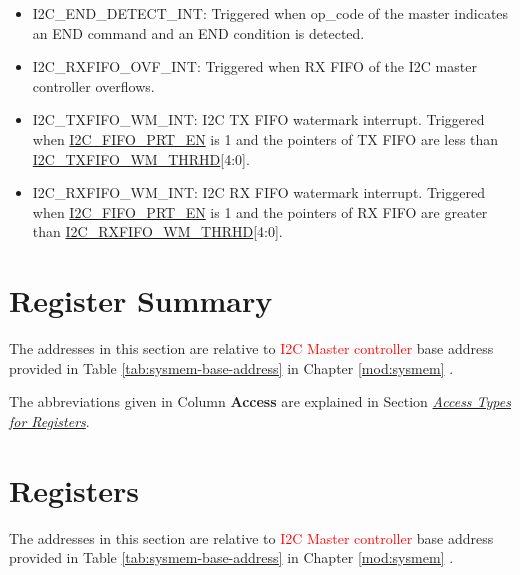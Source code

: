 \documentclass[main\_\_EN.tex]{subfiles}
\begin{document}
\begin{itemize}
\item \label{int:i2c-end}I2C\_END\_DETECT\_INT: Triggered when op\_code of the master indicates an END command and an END condition is detected.
\item \label{int:i2c-rxfifo-ovf}I2C\_RXFIFO\_OVF\_INT: Triggered when RX FIFO of the I2C master controller overflows.
\item \label{int:i2c-txfifo-wm}I2C\_TXFIFO\_WM\_INT: I2C TX FIFO watermark interrupt. Triggered when \hyperref[fielddesc:I2CFIFOPRTEN]{I2C\_FIFO\_PRT\_EN} is 1 and the pointers of TX FIFO are less than \hyperref[fielddesc:I2CTXFIFOWMTHRHD]{I2C\_TXFIFO\_WM\_THRHD}[4:0].
\item \label{int:i2c-rxfifo-wm}I2C\_RXFIFO\_WM\_INT: I2C RX FIFO watermark interrupt. Triggered when \hyperref[fielddesc:I2CFIFOPRTEN]{I2C\_FIFO\_PRT\_EN} is 1 and the pointers of RX FIFO are greater than \hyperref[fielddesc:I2CRXFIFOWMTHRHD]{I2C\_RXFIFO\_WM\_THRHD}[4:0].
\end{itemize}





\clearpage
\hypertarget{i2c-reg-summ}{}
\section{Register Summary}
\label{sec:i2c-reg-summ}

The addresses in this section are relative to \textcolor{red}{I2C Master controller} base address provided in Table \ref{tab:sysmem-base-address} in Chapter \ref{mod:sysmem} \textit{}.

The abbreviations given in Column \textbf{Access} are explained in Section \hyperref[glossary-access-types]{\textit{Access Types for Registers}}.






\clearpage
\section{Registers}

The addresses in this section are relative to \textcolor{red}{I2C Master controller} base address provided in Table \ref{tab:sysmem-base-address} in Chapter \ref{mod:sysmem} \textit{}.


\end{document}
